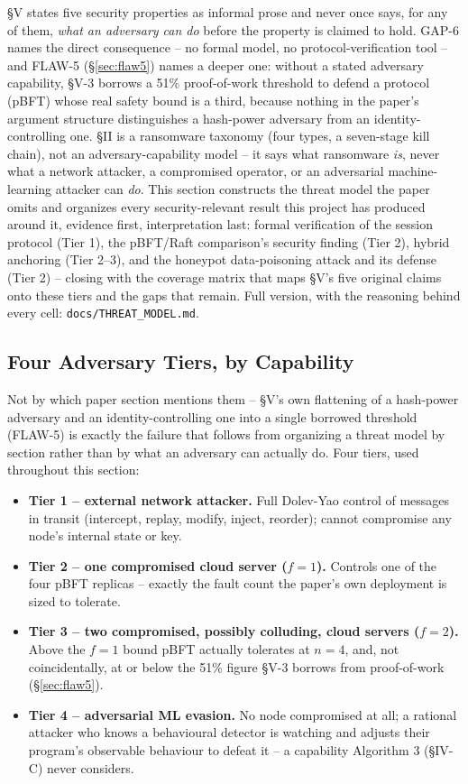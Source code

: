 \documentclass[conference]{IEEEtran}
\begin{document}
\S V states five security properties as informal prose and never once says, for any of them,
\emph{what an adversary can do} before the property is claimed to hold. GAP-6 names the direct
consequence -- no formal model, no protocol-verification tool -- and FLAW-5 (\S\ref{sec:flaw5})
names a deeper one: without a stated adversary capability, \S V-3 borrows a 51\% proof-of-work
threshold to defend a protocol (pBFT) whose real safety bound is a third, because nothing in the
paper's argument structure distinguishes a hash-power adversary from an identity-controlling one.
\S II is a ransomware taxonomy (four types, a seven-stage kill chain), not an adversary-capability
model -- it says what ransomware \emph{is}, never what a network attacker, a compromised operator,
or an adversarial machine-learning attacker can \emph{do}. This section constructs the threat
model the paper omits and organizes every security-relevant result this project has produced
around it, evidence first, interpretation last: formal verification of the session protocol
(Tier 1), the pBFT/Raft comparison's security finding (Tier 2), hybrid anchoring (Tier 2--3), and
the honeypot data-poisoning attack and its defense (Tier 2) -- closing with the coverage matrix
that maps \S V's five original claims onto these tiers and the gaps that remain. Full version,
with the reasoning behind every cell: \texttt{docs/THREAT\_MODEL.md}.

\subsection{Four Adversary Tiers, by Capability}
\label{sec:threat-tiers}

Not by which paper section mentions them -- \S V's own flattening of a hash-power adversary and an
identity-controlling one into a single borrowed threshold (FLAW-5) is exactly the failure that
follows from organizing a threat model by section rather than by what an adversary can actually
do. Four tiers, used throughout this section:

\begin{itemize}
\item \textbf{Tier 1 -- external network attacker.} Full Dolev-Yao control of messages in transit
(intercept, replay, modify, inject, reorder); cannot compromise any node's internal state or key.
\item \textbf{Tier 2 -- one compromised cloud server ($f{=}1$).} Controls one of the four pBFT
replicas -- exactly the fault count the paper's own deployment is sized to tolerate.
\item \textbf{Tier 3 -- two compromised, possibly colluding, cloud servers ($f{=}2$).} Above the
$f{=}1$ bound pBFT actually tolerates at $n{=}4$, and, not coincidentally, at or below the 51\%
figure \S V-3 borrows from proof-of-work (\S\ref{sec:flaw5}).
\item \textbf{Tier 4 -- adversarial ML evasion.} No node compromised at all; a rational attacker
who knows a behavioural detector is watching and adjusts their program's observable behaviour to
defeat it -- a capability Algorithm 3 (\S IV-C) never considers.
\end{itemize}
\end{document}
